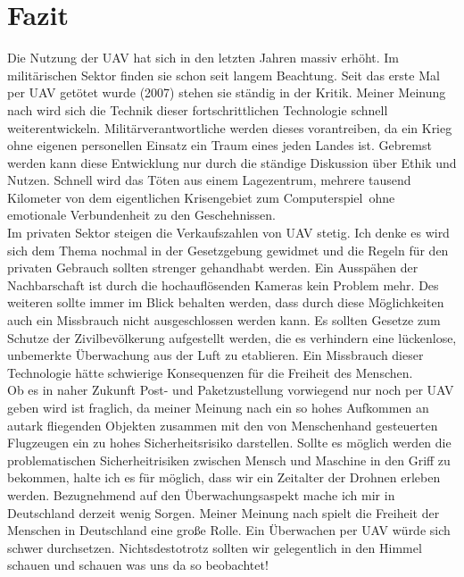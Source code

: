 \section{Fazit}
Die Nutzung der \ac{UAV} hat sich in den letzten Jahren massiv erhöht. Im militärischen Sektor finden sie schon seit langem Beachtung. Seit das erste Mal per \ac{UAV} getötet wurde (2007) stehen sie ständig in der Kritik. Meiner Meinung nach wird sich die Technik dieser fortschrittlichen Technologie schnell weiterentwickeln. Militärverantwortliche werden dieses vorantreiben, da ein Krieg ohne eigenen personellen Einsatz ein Traum eines jeden Landes ist. Gebremst werden kann diese Entwicklung nur durch die ständige Diskussion über Ethik und Nutzen. Schnell wird das Töten aus einem Lagezentrum, mehrere tausend Kilometer von dem eigentlichen Krisengebiet zum \glqq Computerspiel\grqq\ ohne emotionale Verbundenheit zu den Geschehnissen.\\
Im privaten Sektor steigen die Verkaufszahlen von \ac{UAV} stetig. Ich denke es wird sich dem Thema nochmal in der Gesetzgebung gewidmet und die Regeln für den privaten Gebrauch sollten strenger gehandhabt werden. Ein Ausspähen der Nachbarschaft ist durch die hochauflösenden Kameras kein Problem mehr. Des weiteren sollte immer im Blick behalten werden, dass durch diese Möglichkeiten auch ein Missbrauch nicht ausgeschlossen werden kann. Es sollten Gesetze zum Schutze der Zivilbevölkerung aufgestellt werden, die es verhindern eine lückenlose, unbemerkte Überwachung aus der Luft zu etablieren. Ein Missbrauch dieser Technologie hätte schwierige Konsequenzen für die Freiheit des Menschen.\\
Ob es in naher Zukunft Post- und Paketzustellung vorwiegend nur noch per \ac{UAV} geben wird ist fraglich, da meiner Meinung nach ein so hohes Aufkommen an autark fliegenden Objekten zusammen mit den von Menschenhand gesteuerten Flugzeugen ein zu hohes Sicherheitsrisiko darstellen. Sollte es möglich werden die problematischen Sicherheitrisiken zwischen Mensch und Maschine in den Griff zu bekommen, halte ich es für möglich, dass wir ein Zeitalter der Drohnen erleben werden. Bezugnehmend auf den Überwachungsaspekt mache ich mir in Deutschland derzeit wenig Sorgen. Meiner Meinung nach spielt die Freiheit der Menschen in Deutschland eine große Rolle. Ein Überwachen per \ac{UAV} würde sich schwer durchsetzen.
Nichtsdestotrotz sollten wir gelegentlich in den Himmel schauen und schauen was uns da so beobachtet!\\
